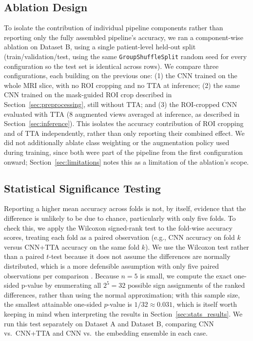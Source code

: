 \documentclass[conference]{IEEEtran}
\begin{document}
\subsection{Ablation Design}
\label{sec:ablation}
To isolate the contribution of individual pipeline components rather than reporting only the fully assembled pipeline's accuracy, we ran a component-wise ablation on Dataset B, using a single patient-level held-out split (train/validation/test, using the same \texttt{GroupShuffleSplit} random seed for every configuration so the test set is identical across rows). We compare three configurations, each building on the previous one: (1) the CNN trained on the whole MRI slice, with no ROI cropping and no TTA at inference; (2) the same CNN trained on the mask-guided ROI crop described in Section~\ref{sec:preprocessing}, still without TTA; and (3) the ROI-cropped CNN evaluated with TTA (8 augmented views averaged at inference, as described in Section~\ref{sec:inference}). This isolates the accuracy contribution of ROI cropping and of TTA independently, rather than only reporting their combined effect. We did not additionally ablate class weighting or the augmentation policy used during training, since both were part of the pipeline from the first configuration onward; Section~\ref{sec:limitations} notes this as a limitation of the ablation's scope.

\subsection{Statistical Significance Testing}
\label{sec:stats_protocol}
Reporting a higher mean accuracy across folds is not, by itself, evidence that the difference is unlikely to be due to chance, particularly with only five folds. To check this, we apply the Wilcoxon signed-rank test \cite{wilcoxon1945} to the fold-wise accuracy scores, treating each fold as a paired observation (e.g., CNN accuracy on fold $k$ versus CNN+TTA accuracy on the same fold $k$). We use the Wilcoxon test rather than a paired $t$-test because it does not assume the differences are normally distributed, which is a more defensible assumption with only five paired observations per comparison \cite{demsar2006statistical}. Because $n=5$ is small, we compute the exact one-sided p-value by enumerating all $2^5=32$ possible sign assignments of the ranked differences, rather than using the normal approximation; with this sample size, the smallest attainable one-sided $p$-value is $1/32 \approx 0.031$, which is itself worth keeping in mind when interpreting the results in Section~\ref{sec:stats_results}. We run this test separately on Dataset A and Dataset B, comparing CNN vs.\ CNN+TTA and CNN vs.\ the embedding ensemble in each case.
\end{document}
